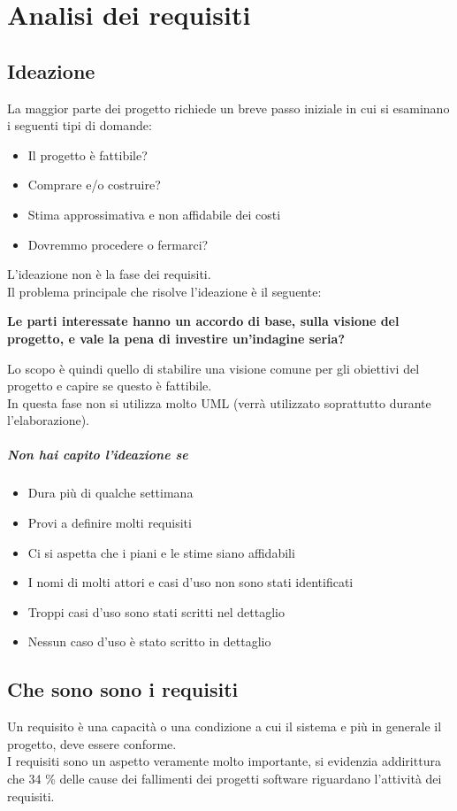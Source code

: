 \chapter{Analisi dei requisiti}
\section{Ideazione}
La maggior parte dei progetto richiede un breve passo iniziale in cui
si esaminano i seguenti tipi di domande:
\begin{itemize}
    \item Il progetto è fattibile?
    \item Comprare e/o costruire?
    \item Stima approssimativa e non affidabile dei costi
    \item Dovremmo procedere o fermarci?
\end{itemize}
L'ideazione non è la fase dei requisiti.
\\ Il problema principale che risolve l'ideazione è il seguente:
\begin{center}
    \textbf{Le parti interessate hanno un accordo di base, sulla visione
    del progetto, e vale la pena di investire un'indagine seria?}
\end{center}
Lo scopo è quindi quello di stabilire una visione comune per gli obiettivi del progetto
e capire se questo è fattibile.
\\ In questa fase non si utilizza molto UML (verrà utilizzato soprattutto durante
 l'elaborazione).
\paragraph*{Non hai capito l'ideazione se}
\begin{itemize}
    \item Dura più di qualche settimana
    \item Provi a definire molti requisiti
    \item Ci si aspetta che i piani e le stime siano affidabili
    \item I nomi di molti attori e casi d'uso non sono stati identificati
    \item Troppi casi d'uso sono stati scritti nel dettaglio
    \item Nessun caso d'uso è stato scritto in dettaglio
\end{itemize}
\section{Che sono sono i requisiti}
Un requisito è una capacità o una condizione a cui il sistema e più in generale il
progetto, deve essere conforme.
\\ I requisiti sono un aspetto veramente molto importante, si evidenzia
addirittura che 34 \% delle cause dei fallimenti dei progetti software
riguardano l'attività dei requisiti.
